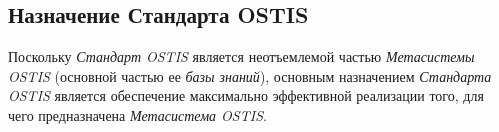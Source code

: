 \begin{SCn}
\begin{scnindent}
\begin{scneqtovector}
\begin{scnindent}
			\end{scnindent}
			\begin{scnindent}
			\end{scnindent}
		\end{scneqtovector}
	\end{scnindent}
\end{SCn}	

\subsection{Назначение Стандарта OSTIS}
\label{standard_purpose}

Поскольку \textit{Стандарт OSTIS} является неотъемлемой частью \textit{Метасистемы OSTIS} (основной частью ее \textit{базы знаний}), основным назначением \textit{Стандарта OSTIS} является обеспечение максимально эффективной реализации того, для чего предназначена \textit{Метасистема OSTIS}.

